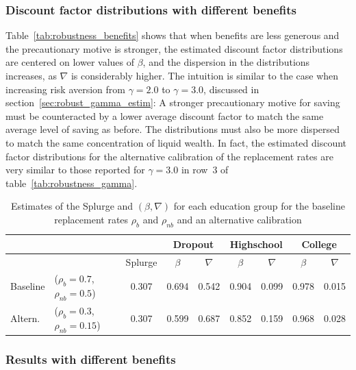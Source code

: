 \documentclass[\econtexRoot/HAFiscal]{subfiles}
\begin{document}
\subsubsection{Discount factor distributions with different benefits}
\notinsubfile{\label{sec:robust_benefits_estim}}

Table~\ref{tab:robustness_benefits} shows that when benefits are less generous and the precautionary motive is stronger, the estimated discount factor distributions are centered on lower values of $\beta$, and the dispersion in the distributions increases, as $\nabla$ is considerably higher. The intuition is similar to the case when increasing risk aversion from $\gamma=2.0$ to $\gamma=3.0$, discussed in section~\ref{sec:robust_gamma_estim}: A stronger precautionary motive for saving must be counteracted by a lower average discount factor to match the same average level of saving as before. The distributions must also be more dispersed to match the same concentration of liquid wealth. In fact, the estimated discount factor distributions for the alternative calibration of the replacement rates are very similar to those reported for $\gamma=3.0$ in row~3 of table~\ref{tab:robustness_gamma}. 

\begin{table}[t]
  \begin{center}
    \begin{tabular}{llc|cccccc} 
      \toprule
      & & & \multicolumn{2}{c}{Dropout} & \multicolumn{2}{c}{Highschool} & \multicolumn{2}{c}{College} \\ \midrule 
      & & Splurge & $\beta$ & $\nabla$ & $\beta$ & $\nabla$ & $\beta$ & $\nabla$ \\ \midrule 
      Baseline & ($\rho_{b}=0.7$, $\rho_{nb}=0.5$) & 0.307 & 0.694 & 0.542 & 0.904 & 0.099 & 0.978 & 0.015 \\ 
      Altern. & ($\rho_{b}=0.3$,  $\rho_{nb}=0.15$) & 0.307 & 0.599 & 0.687 & 0.852 & 0.159 & 0.968 & 0.028
      \\ \bottomrule 
    \end{tabular}
  \end{center}
  \caption{Estimates of the Splurge and $(\beta,\nabla)$ for each education group for the baseline replacement rates $\rho_{b}$ and $\rho_{nb}$ and an alternative calibration}
  \notinsubfile{\label{tab:robustness_benefits}}
\end{table}


\FloatBarrier
\subsubsection{Results with different benefits}
\notinsubfile{\label{sec:robust_benefits_results}}
\end{document}

